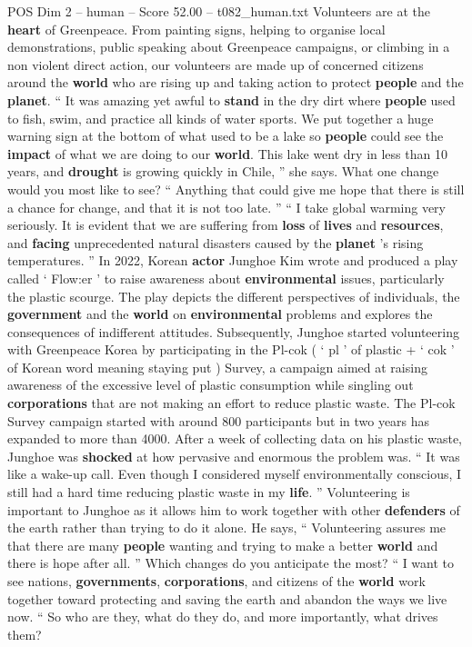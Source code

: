 \begin{textsample}{POS Dim 2 – human – Score 52.00 – t082\_human.txt}  \label{ex:f2_pos_027}
Volunteers are at the \textbf{heart} of Greenpeace.
From painting signs, helping to organise local demonstrations, public speaking about Greenpeace campaigns, or climbing in a non violent direct action, our volunteers are made up of concerned citizens around the \textbf{world} who are rising up and taking action to protect \textbf{people} and the \textbf{planet}. “ It was amazing yet awful to \textbf{stand} in the dry dirt where \textbf{people} used to fish, swim, and practice all kinds of water sports.
We put together a huge warning sign at the bottom of what used to be a lake so \textbf{people} could see the \textbf{impact} of what we are doing to our \textbf{world}.
This lake went dry in less than 10 years, and \textbf{drought} is growing quickly in Chile, ” she says.
What one change would you most like to see? “ Anything that could give me hope that there is still a chance for change, and that it is not too late. ” “ I take global warming very seriously.
It is evident that we are suffering from \textbf{loss} of \textbf{lives} and \textbf{resources}, and \textbf{facing} unprecedented natural disasters caused by the \textbf{planet} ’s rising temperatures. ” In 2022, Korean \textbf{actor} Junghoe Kim wrote and produced a play called ‘ Flow:er ’ to raise awareness about \textbf{environmental} issues, particularly the plastic scourge.
The play depicts the different perspectives of individuals, the \textbf{government} and the \textbf{world} on \textbf{environmental} problems and explores the consequences of indifferent attitudes.
Subsequently, Junghoe started volunteering with Greenpeace Korea by participating in the Pl-cok ( ‘ pl ’ of plastic + ‘ cok ’ of Korean word meaning staying put ) Survey, a campaign aimed at raising awareness of the excessive level of plastic consumption while singling out \textbf{corporations} that are not making an effort to reduce plastic waste.
The Pl-cok Survey campaign started with around 800 participants but in two years has expanded to more than 4000.
After a week of collecting data on his plastic waste, Junghoe was \textbf{shocked} at how pervasive and enormous the problem was. “ It was like a wake-up call.
Even though I considered myself environmentally conscious, I still had a hard time reducing plastic waste in my \textbf{life}. ” Volunteering is important to Junghoe as it allows him to work together with other \textbf{defenders} of the earth rather than trying to do it alone.
He says, “ Volunteering assures me that there are many \textbf{people} wanting and trying to make a better \textbf{world} and there is hope after all. ” Which changes do you anticipate the most? “ I want to see nations, \textbf{governments}, \textbf{corporations}, and citizens of the \textbf{world} work together toward protecting and saving the earth and abandon the ways we live now. “ So who are they, what do they do, and more importantly, what drives them?

\end{textsample}
